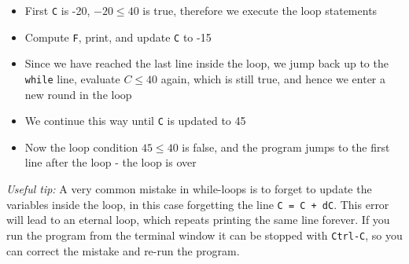 \documentclass[graybox,envcountchap,sectrefs,final]{svmonodo}
\begin{document}
\begin{itemize}
  \item First \texttt{C} is -20, $-20 \leq 40$ is true, therefore we execute the loop statements

  \item Compute \texttt{F}, print, and update \texttt{C} to -15

  \item Since we have reached the last line inside the loop, we jump back
    up to the \texttt{while} line, evaluate $C\leq 40$ again, which is still true, and hence we enter a new round in the loop

  \item We continue this way until \texttt{C} is updated to 45

  \item Now the loop condition $45\leq 40$ is false, and the program jumps to the first line after the loop - the loop is over
\end{itemize}

\noindent
\emph{Useful tip:} A very common mistake in while-loops is to forget to update the variables inside the loop,
in this case forgetting the line \texttt{C = C + dC}. This error will lead to an eternal loop, which repeats printing
the same line forever.
If you run the program from the terminal window it can be stopped with \texttt{Ctrl-C}, so you can correct the mistake
and re-run the program.
\end{document}
